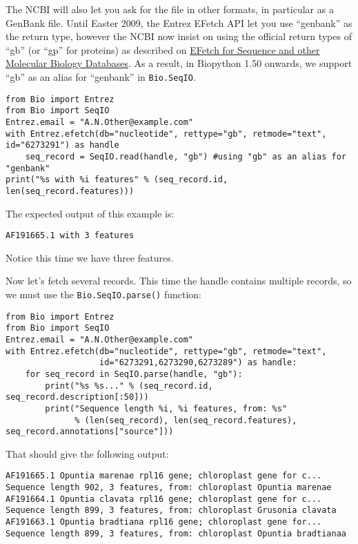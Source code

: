 The NCBI will also let you ask for the file in other formats, in particular as
a GenBank file. Until Easter 2009, the Entrez EFetch API let you use ``genbank''
as the return type, however the NCBI now insist on using the official
return types of ``gb'' (or ``gp'' for proteins) as described on
\href{https://www.ncbi.nlm.nih.gov/books/NBK3837/}
{EFetch for Sequence and other Molecular Biology Databases}.
As a result, in Biopython 1.50 onwards, we support ``gb'' as an
alias for ``genbank'' in \verb|Bio.SeqIO|.

\begin{verbatim}
from Bio import Entrez
from Bio import SeqIO
Entrez.email = "A.N.Other@example.com"
with Entrez.efetch(db="nucleotide", rettype="gb", retmode="text", id="6273291") as handle
    seq_record = SeqIO.read(handle, "gb") #using "gb" as an alias for "genbank"
print("%s with %i features" % (seq_record.id, len(seq_record.features)))
\end{verbatim}

\noindent The expected output of this example is:

\begin{verbatim}
AF191665.1 with 3 features
\end{verbatim}

\noindent Notice this time we have three features.

Now let's fetch several records.  This time the handle contains multiple records,
so we must use the \verb|Bio.SeqIO.parse()| function:

\begin{verbatim}
from Bio import Entrez
from Bio import SeqIO
Entrez.email = "A.N.Other@example.com"
with Entrez.efetch(db="nucleotide", rettype="gb", retmode="text",
                   id="6273291,6273290,6273289") as handle:
    for seq_record in SeqIO.parse(handle, "gb"):
        print("%s %s..." % (seq_record.id, seq_record.description[:50]))
        print("Sequence length %i, %i features, from: %s"
              % (len(seq_record), len(seq_record.features), seq_record.annotations["source"]))
\end{verbatim}

\noindent That should give the following output:

\begin{verbatim}
AF191665.1 Opuntia marenae rpl16 gene; chloroplast gene for c...
Sequence length 902, 3 features, from: chloroplast Opuntia marenae
AF191664.1 Opuntia clavata rpl16 gene; chloroplast gene for c...
Sequence length 899, 3 features, from: chloroplast Grusonia clavata
AF191663.1 Opuntia bradtiana rpl16 gene; chloroplast gene for...
Sequence length 899, 3 features, from: chloroplast Opuntia bradtianaa
\end{verbatim}

